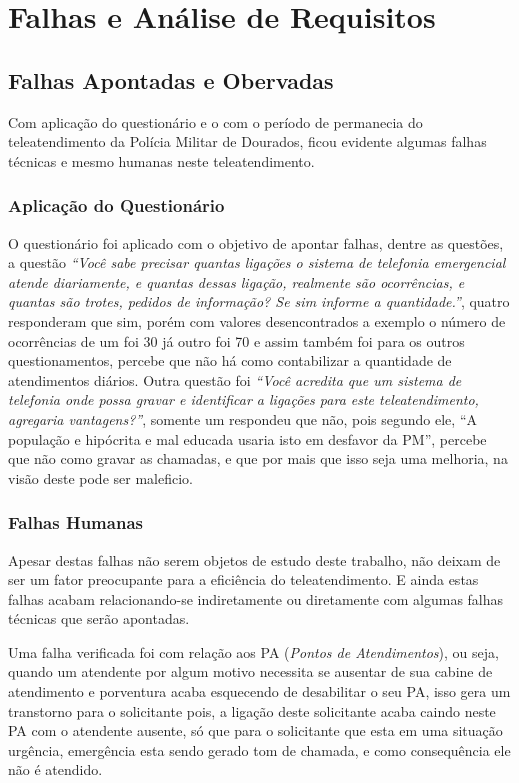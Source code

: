 
\chapter{Falhas e Análise de Requisitos} %
\section{Falhas Apontadas e Obervadas}
Com aplicação do questionário e o com o período de permanecia do teleatendimento da Polícia Militar de Dourados, ficou evidente algumas falhas técnicas e mesmo humanas neste teleatendimento.

\subsection{Aplicação do Questionário}
O questionário foi aplicado com o objetivo de apontar falhas, dentre as questões, a questão \textit{“Você sabe precisar quantas ligações o sistema de telefonia emergencial atende diariamente, e quantas dessas ligação, realmente são ocorrências, e quantas são trotes, pedidos de informação? Se sim informe a quantidade.”}, quatro responderam que sim, porém com valores desencontrados a exemplo o número de ocorrências de um foi 30 já outro foi 70 e assim também foi para os outros questionamentos, percebe que não há como contabilizar a quantidade de atendimentos diários. Outra questão foi \textit{“Você acredita que um sistema de telefonia onde possa gravar e identificar a ligações para este teleatendimento, agregaria vantagens?”}, somente um respondeu que não, pois segundo ele, “A população e hipócrita e mal educada usaria isto em desfavor da PM”, percebe que não como gravar as chamadas, e que por mais que isso seja uma melhoria, na visão deste pode ser maleficio.

\subsection{Falhas Humanas}
Apesar destas falhas não serem objetos de estudo deste trabalho, não deixam de ser um fator preocupante para a eficiência do teleatendimento. E ainda estas falhas acabam relacionando-se indiretamente ou diretamente com algumas falhas técnicas que serão apontadas.

Uma falha verificada foi com relação aos PA (\textit{Pontos de Atendimentos}), ou seja, quando um atendente por algum motivo necessita se ausentar de sua cabine de atendimento e porventura acaba esquecendo de desabilitar o seu PA, isso gera um transtorno para o solicitante pois, a ligação deste solicitante acaba caindo neste PA com o atendente ausente, só que para o solicitante que esta em uma situação urgência, emergência esta sendo gerado tom de chamada, e como consequência ele não é atendido.

